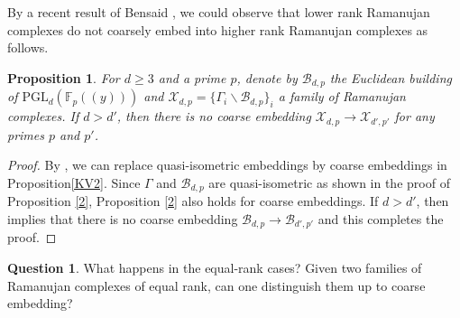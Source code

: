 \documentclass[letterpaper, reqno, 11pt]{amsart}
\newtheorem{proposition}[theorem]{Proposition}
\theoremstyle{definition}
\theoremstyle{definition}
\newtheorem{question}[theorem]{Question}
\theoremstyle{remark}
\begin{document}
By a recent result of Bensaid \cite{bensaid2022coarse}, we could observe that lower rank Ramanujan complexes do not coarsely embed into higher rank Ramanujan complexes as follows.
\begin{proposition}
    For $d \geq3$ and a prime $p$, denote by $\mathcal{B}_{d,p}$  the Euclidean building of $\mathrm{PGL}_d(\mathbb{F}_p((y)))$ and
    $\mathscr{X}_{d,p}=\{\Gamma_i \backslash \mathcal{B}_{d,p}\}_i$ a family of Ramanujan complexes.
  If $d > d'$, then there is no coarse embedding $\mathscr{X}_{d,p} \to \mathscr{X}_{d',p'}$ for any primes $p$ and $p'$.
\end{proposition}


\begin{proof}
   By \cite[Proposition 3.1]{das2018geometry}, we can replace quasi-isometric embeddings by coarse embeddings in Proposition\ref{KV2}. 
   Since $\Gamma$ and $\mathcal{B}_{d,p}$ are quasi-isometric as shown in the proof of Proposition \ref{2}, Proposition \ref{2} also holds for coarse embeddings.
   If $d>d'$, then \cite[Theorem 1.4]{bensaid2022coarse} implies that there is no coarse embedding $\mathcal{B}_{d,p} \to \mathcal{B}_{d',p'}$  and this completes the proof. 
\end{proof}




\begin{question}
    What happens in the equal-rank cases? Given two families of Ramanujan complexes of equal rank, can one distinguish them up to coarse embedding?
\end{question}







\end{document}
